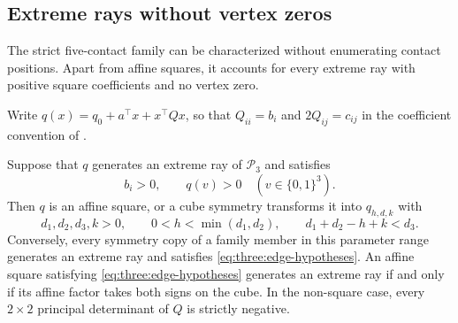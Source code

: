 \subsection{Extreme rays without vertex zeros}
\label{sec:three:edge-classification}

The strict five-contact family can be characterized without enumerating
contact positions. Apart from affine squares, it accounts for every
extreme ray with positive square coefficients and no vertex zero.

Write $q(x)=q_0+a^\top x+x^\top Qx$, so that $Q_{ii}=b_i$ and
$2Q_{ij}=c_{ij}$ in the coefficient convention of
.

\begin{theorem}\label{three:edge-classification}
Suppose that $q$ generates an extreme ray of $\mathcal P_3$ and satisfies
\begin{equation}\label{eq:three:edge-hypotheses}
 b_i>0,\qquad
 q(v)>0\quad(v\in\{0,1\}^3).
\end{equation}
Then $q$ is an affine square, or a cube symmetry transforms it into
$q_{h,d,k}$ with
\[
 d_1,d_2,d_3,k>0,\qquad
 0<h<\min(d_1,d_2),\qquad d_1+d_2-h+k<d_3.
\]
Conversely, every symmetry copy of a family member in this parameter range
generates an extreme ray and satisfies \eqref{eq:three:edge-hypotheses}.
An affine square satisfying \eqref{eq:three:edge-hypotheses} generates an
extreme ray if and only if its affine factor takes both signs on the cube.
In the non-square case, every $2\times2$ principal determinant of $Q$ is
strictly negative.
\end{theorem}

